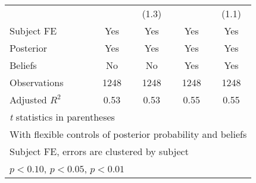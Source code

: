 \begin{table}[htbp]
\begin{tabular}{l*{4}{c}}
                &                  &    (1.3)         &                  &    (1.1)         \\
Subject FE      &      Yes         &      Yes         &      Yes         &      Yes         \\
Posterior       &      Yes         &      Yes         &      Yes         &      Yes         \\
Beliefs         &       No         &       No         &      Yes         &      Yes         \\
\hline
Observations    &     1248         &     1248         &     1248         &     1248         \\
Adjusted \(R^{2}\)&     0.53         &     0.53         &     0.55         &     0.55         \\
\hline\hline
\multicolumn{5}{l}{\footnotesize \textit{t} statistics in parentheses}\\
\multicolumn{5}{l}{\footnotesize With flexible controls of posterior probability and beliefs}\\
\multicolumn{5}{l}{\footnotesize Subject FE, errors are clustered by subject}\\
\multicolumn{5}{l}{\footnotesize \sym{*} \(p<0.10\), \sym{**} \(p<0.05\), \sym{***} \(p<0.01\)}\\
\end{tabular}
\end{table}
